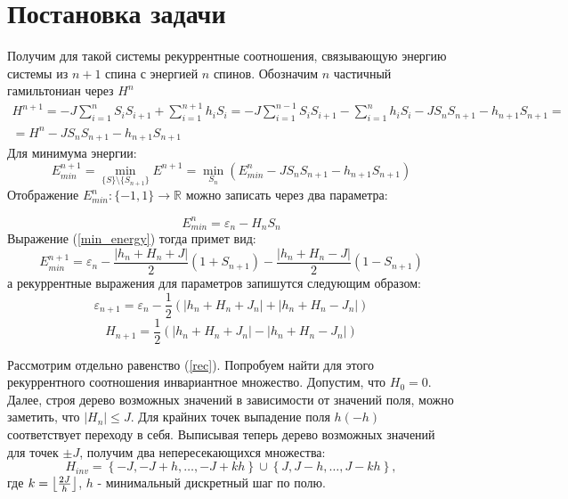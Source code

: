 
\section{Постановка задачи}
	
	\newtheorem{ut}{Утверждение}
	\newtheorem*{zam}{Замечание}
	Получим для такой системы рекуррентные соотношения, связывающую энергию системы из $n+1$ спина с энергией $n$ спинов.  Обозначим $n$ частичный гамильтониан через $H^n$
	\begin{multline}
		H^{n+1} = - J\sum_{i=1} ^{n}  S_i S_{i+1} + \sum_{i=1}^{n+1} h_i S_i  = 
		-J \sum_{i=1}^{n-1} S_{i} S_{i+1} - \sum_{i=1}^{n} h_i S_i - J S_n S_{n+1} - h_{n+1} S_{n+1} = \\=
		H^n - J S_n S_{n+1} - h_{n+1} S_{n+1} 
	\end{multline}
	Для минимума энергии:
	\begin{equation}
	\label{min_energy}
	E_{min}^{n+1} = \min_{\{S\}\setminus \{S_{n+1}\}} E^{n+1} = \min_{S_n}(E_{min}^{n} - J S_n S_{n+1} - h_{n+1} S_{n+1})
	\end{equation}
	Отображение $E_{min}^n : \{-1, 1\}  \to \mathbb{R}$ можно записать через два параметра:
	
	\begin{equation}
	E^n_{min} = \varepsilon_n - H_n S_n
	\end{equation}
	Выражение (\ref{min_energy}) тогда примет вид:
	\begin{equation}
	E_{min}^{n+1} = \varepsilon_n - \frac {\left|h_n +H_n+J\right|} 2 (1+S_{n+1})  - \frac{\left|h_n+H_n-J\right|} 2 (1 - S_{n+1})
	\end{equation}
	а рекуррентные выражения для параметров запишутся следующим образом: 
	\begin{equation}
	\varepsilon_{n+1} = \varepsilon_n - \frac{1} 2 \left(|h_n + H_n + J_n| + |h_n+H_n - J_n| \right)
	\end{equation}
	\begin{equation}
	\label{rec}
	H_{n+1} = \frac{1}{2} \left(|h_n + H_n + J_n| - |h_n + H_n - J_n| \right)
	\end{equation}

	Рассмотрим отдельно равенство (\ref{rec}). 
	Попробуем найти для этого рекуррентного соотношения инвариантное множество. Допустим, что $H_0=0$.
	 Далее, строя дерево возможных значений в зависимости от значений поля, можно заметить, что $|H_{n}| \leq J$. Для крайних точек выпадение поля $h (-h)$ соответствует переходу в себя.
	Выписывая теперь дерево возможных значений для точек $\pm J$, получим два непересекающихся множества:
	 \begin{equation}
		H_{inv} = \left\{ -J, -J + h, \dots, -J + kh \right\} \cup \left\{ J, J - h, \dots, J - kh \right\},
	\end{equation}
	где $k = \floor*{ \frac{2J}{h}}$, $h$ - минимальный дискретный шаг по полю.

